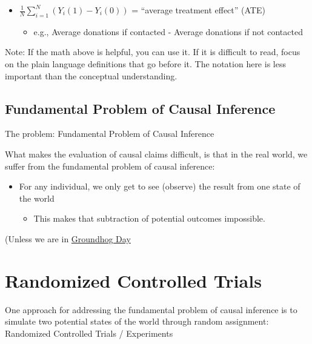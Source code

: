 \documentclass[
  letterpaper,
  DIV=11,
  numbers=noendperiod]{scrreprt}
\providecommand{\tightlist}{%
  \setlength{\itemsep}{0pt}\setlength{\parskip}{0pt}}\usepackage{longtable,booktabs,array}
\begin{document}
\begin{itemize}
\tightlist
\item
  \(\frac{1}{N} \sum_{i=1}^N (Y_i (1)-Y_i (0))\) = ``average treatment
  effect'' (ATE)

  \begin{itemize}
  \tightlist
  \item
    e.g., Average donations if contacted - Average donations if not
    contacted
  \end{itemize}
\end{itemize}

Note: If the math above is helpful, you can use it. If it is difficult
to read, focus on the plain language definitions that go before it. The
notation here is less important than the conceptual understanding.

\hypertarget{fundamental-problem-of-causal-inference}{%
\subsection{Fundamental Problem of Causal
Inference}\label{fundamental-problem-of-causal-inference}}

The problem: Fundamental Problem of Causal Inference

What makes the evaluation of causal claims difficult, is that in the
real world, we suffer from the fundamental problem of causal inference:

\begin{itemize}
\tightlist
\item
  For any individual, we only get to see (observe) the result from one
  state of the world

  \begin{itemize}
  \tightlist
  \item
    This makes that subtraction of potential outcomes impossible.
  \end{itemize}
\end{itemize}

(Unless we are in
\href{https://www.youtube.com/watch?v=5E0M6Rh9qpg}{Groundhog Day}

\hypertarget{randomized-controlled-trials}{%
\section{Randomized Controlled
Trials}\label{randomized-controlled-trials}}

One approach for addressing the fundamental problem of causal inference
is to simulate two potential states of the world through random
assignment: Randomized Controlled Trials / Experiments
\end{document}
